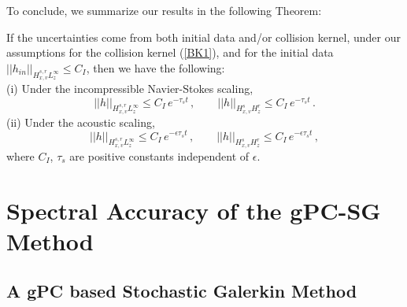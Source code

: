 \documentclass[final,onefignum,onetabnum]{siamart171218}
\begin{document}
To conclude, we summarize our results in the following Theorem:

\begin{theorem}
\label{random_kernel}
If the uncertainties come from both initial data and/or collision kernel, under our assumptions
for the collision kernel (\ref{BK1}), and for the initial data 
$||h_{in}||_{H_{x,v}^{s,r} L_z^{\infty}} \leq C_{I}$, then we have the following: \\
(i) Under the incompressible Navier-Stokes scaling, 
$$||h||_{H_{x,v}^{s,r} L_z^{\infty}}\leq C_I\, e^{-\tau_s t}\,, \qquad
||h||_{H_{x,v}^{s} H_z^r} \leq C_I\,  e^{-\tau_s t}\,.$$
(ii) Under the acoustic scaling, 
$$||h||_{H_{x,v}^{s,r} L_z^{\infty}}\leq C_I\, e^{-\epsilon\tau_s t}\,, \qquad
||h||_{H_{x,v}^{s} H_z^r} \leq C_I\,  e^{-\epsilon\tau_s t}\,,$$
where $C_I$, $\tau_s$ are positive constants independent of $\epsilon$. 
\end{theorem}

\section{Spectral Accuracy of the gPC-SG Method}
\label{gPC}
\subsection{A gPC based Stochastic Galerkin Method}
\end{document}
